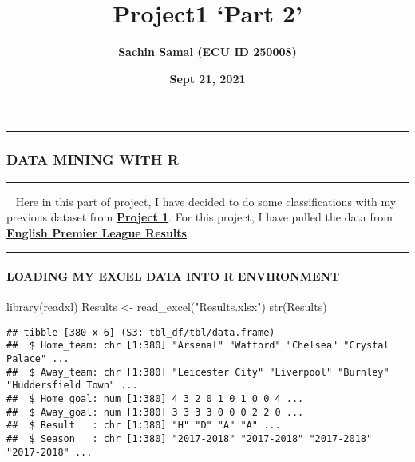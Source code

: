 \documentclass[
]{article}
\title{\textbf{Project1 `Part 2'}}
\author{\textbf{Sachin Samal (ECU ID 250008)}}
\date{\textbf{Sept 21, 2021}}
\newenvironment{Shaded}{\begin{snugshade}}{\end{snugshade}}
\newcommand{\FunctionTok}[1]{\textcolor[rgb]{0.00,0.00,0.00}{#1}}
\newcommand{\NormalTok}[1]{#1}
\newcommand{\OtherTok}[1]{\textcolor[rgb]{0.56,0.35,0.01}{#1}}
\newcommand{\StringTok}[1]{\textcolor[rgb]{0.31,0.60,0.02}{#1}}
\begin{document}
\maketitle

\begin{center}\rule{0.5\linewidth}{0.5pt}\end{center}

\hypertarget{data-mining-with-r}{%
\subsubsection{\texorpdfstring{\textbf{DATA MINING WITH
R}}{DATA MINING WITH R}}\label{data-mining-with-r}}

\begin{center}\rule{0.5\linewidth}{0.5pt}\end{center}

~ Here in this part of project, I have decided to do some
classifications with my previous dataset from
\href{https://rpubs.com/sacsam005/808877}{\textbf{Project 1}}. For this
project, I have pulled the data from
\href{https://www.premierleague.com/results.}{\textbf{English Premier
League Results}}.

\begin{center}\rule{0.5\linewidth}{0.5pt}\end{center}

\hypertarget{loading-my-excel-data-into-r-environment}{%
\paragraph{\texorpdfstring{\textbf{LOADING MY EXCEL DATA INTO R
ENVIRONMENT}}{LOADING MY EXCEL DATA INTO R ENVIRONMENT}}\label{loading-my-excel-data-into-r-environment}}

\begin{Shaded}
\begin{Highlighting}[]
\FunctionTok{library}\NormalTok{(readxl)}
\NormalTok{Results }\OtherTok{\textless{}{-}} \FunctionTok{read\_excel}\NormalTok{(}\StringTok{"Results.xlsx"}\NormalTok{)}
\FunctionTok{str}\NormalTok{(Results)}
\end{Highlighting}
\end{Shaded}

\begin{verbatim}
## tibble [380 x 6] (S3: tbl_df/tbl/data.frame)
##  $ Home_team: chr [1:380] "Arsenal" "Watford" "Chelsea" "Crystal Palace" ...
##  $ Away_team: chr [1:380] "Leicester City" "Liverpool" "Burnley" "Huddersfield Town" ...
##  $ Home_goal: num [1:380] 4 3 2 0 1 0 1 0 0 4 ...
##  $ Away_goal: num [1:380] 3 3 3 3 0 0 0 2 2 0 ...
##  $ Result   : chr [1:380] "H" "D" "A" "A" ...
##  $ Season   : chr [1:380] "2017-2018" "2017-2018" "2017-2018" "2017-2018" ...
\end{verbatim}
\end{document}
